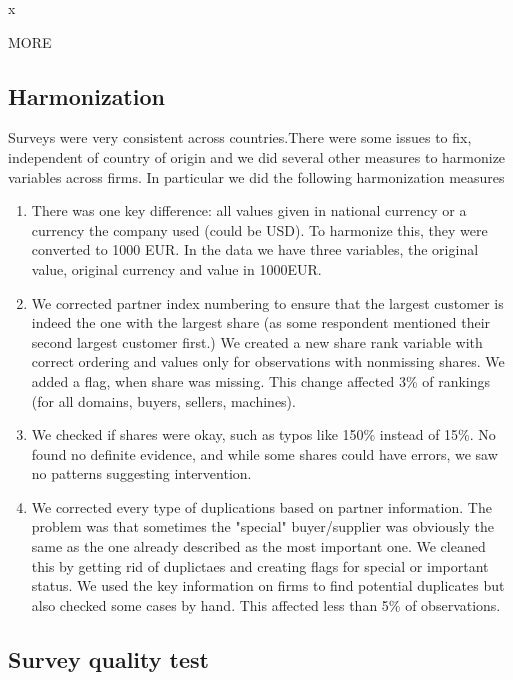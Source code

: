 x\documentclass[final, dvipsnames, authoryear,12pt]{elsarticle}
\begin{document}
MORE


\subsection{Harmonization} 

Surveys were very consistent across countries.There were some issues to fix, independent of country of origin and we did several other measures to harmonize variables across firms. In particular we did the following harmonization measures

\begin{enumerate}
    \item There was one key difference: all values given in national currency or a currency the company used (could be USD). To harmonize this, they were converted to 1000 EUR. In the data we have three variables, the original value, original currency and value in 1000EUR. 
    
    \item We corrected partner index numbering to ensure that the largest customer is indeed the one with the largest share (as some respondent mentioned their second largest customer first.) We created a new share rank variable with correct ordering and values only for observations with nonmissing shares. We added a flag, when share was missing. This change affected 3\% of rankings (for all domains, buyers, sellers, machines). 
    
    \item We checked if shares were okay, such as typos like 150\% instead of 15\%.  No found no definite evidence, and while some shares could have errors, we saw no patterns suggesting intervention.
    
    \item We corrected every type of duplications based on partner information. The problem was that sometimes the "special" buyer/supplier was obviously the same as the one already described as the most important one. We cleaned this by getting rid of duplictaes and creating flags for special or important status. We used the key information on firms to find potential duplicates but also checked some cases by hand. This affected less than 5\% of observations.

\end{enumerate}

\subsection{Survey quality test}
\end{document}
